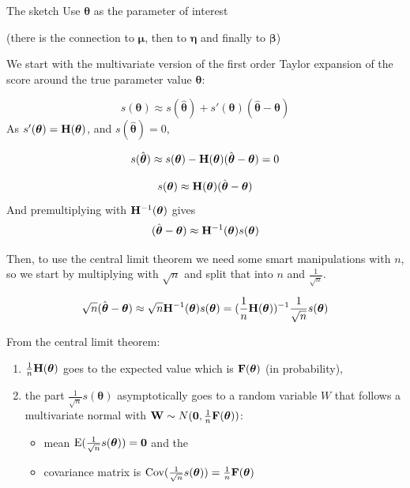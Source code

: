 \documentclass[
  ignorenonframetext,
]{beamer}
\providecommand{\tightlist}{%
  \setlength{\itemsep}{0pt}\setlength{\parskip}{0pt}}
\begin{document}
\begin{frame}
\begin{block}{The sketch}
\protect\hypertarget{the-sketch}{}
Use \(\boldsymbol{\theta}\) as the parameter of interest

(there is the connection to \(\boldsymbol{\mu}\), then to
\(\boldsymbol{\eta}\) and finally to \(\boldsymbol{\beta}\))

We start with the multivariate version of the first order Taylor
expansion of the score around the true parameter value
\(\boldsymbol{\theta}\):

\[s({\boldsymbol{\theta}}) \approx s(\hat{\boldsymbol{\theta}}) + s'({\boldsymbol{\theta}})(\hat{\boldsymbol{\theta}}-{\boldsymbol{\theta}})\]
As \(s'({\boldsymbol{\theta}}) = {\bf H}({\boldsymbol{\theta}})\), and
\(s(\hat{\boldsymbol{\theta}})=0\),

\[s(\hat{\boldsymbol{\theta}})\approx s({\boldsymbol{\theta}})-{\bf H}({\boldsymbol{\theta}})(\hat{\boldsymbol{\theta}}-{\boldsymbol{\theta}}) = 0\]

\[s({\boldsymbol{\theta}})\approx {\bf H}({\boldsymbol{\theta}})(\hat{\boldsymbol{\theta}}-{\boldsymbol{\theta}})\]
And premultiplying with \({\bf H}^{-1}(\boldsymbol{\theta})\) gives
\[ (\hat{\boldsymbol{\theta}}-{\boldsymbol{\theta}})\approx {\bf H}^{-1}({\boldsymbol{\theta}})s({\boldsymbol{\theta}})\]
\end{block}
\end{frame}

\begin{frame}
Then, to use the central limit theorem we need some smart manipulations
with \(n\), so we start by multiplying with \(\sqrt{n}\) and split that
into \(n\) and \(\frac{1}{\sqrt{n}}\).

\[ \sqrt{n}(\hat{\boldsymbol{\theta}}-{\boldsymbol{\theta}})\approx \sqrt{n}{\bf H}^{-1}({\boldsymbol{\theta}})s({\boldsymbol{\theta}})=(\frac{1}{n}{\bf H}({\boldsymbol{\theta}}))^{-1}\frac{1}{\sqrt{n}}s({\boldsymbol{\theta}})\]

From the central limit theorem:

\begin{enumerate}
[1)]
\item
  \(\frac{1}{n}{\bf H}(\boldsymbol{\theta})\) goes to the expected value
  which is \({\bf F}(\boldsymbol{\theta})\) (in probability),
\item
  the part \(\frac{1}{\sqrt{n}}s({\boldsymbol{\theta}})\) asymptotically
  goes to a random variable \(W\) that follows a multivariate normal
  with
  \({\bf W} \sim N({\bf 0},\frac{1}{n}{\bf F}(\boldsymbol{\theta}))\):

  \begin{itemize}
  \tightlist
  \item
    mean
    \(\text{E}(\frac{1}{\sqrt{n}}s({\boldsymbol{\theta}}))={\bf 0}\) and
    the
  \item
    covariance matrix is
    \(\text{Cov}(\frac{1}{\sqrt{n}}s({\boldsymbol{\theta}}))=\frac{1}{n}{\bf F}(\boldsymbol{\theta})\)
  \end{itemize}
\end{enumerate}
\end{frame}
\end{document}
